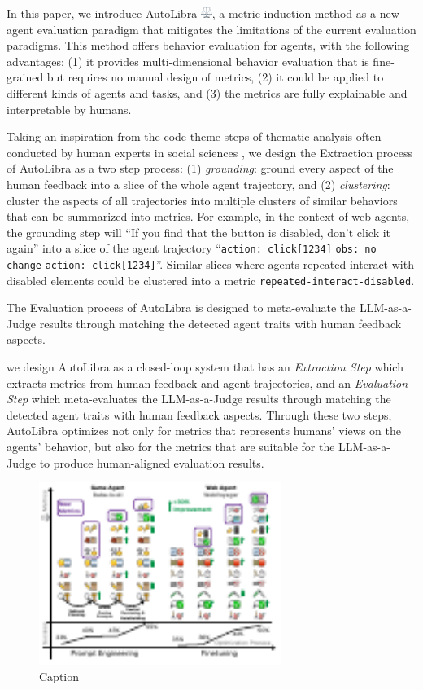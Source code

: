 In this paper, we introduce AutoLibra \protect\includegraphics[height=1em]{figs/scale.png},
a metric induction method as a new agent evaluation paradigm 
that mitigates the limitations of the current evaluation paradigms.
This method offers behavior evaluation for agents, with the following advantages:
(1) it provides multi-dimensional behavior evaluation that is fine-grained but requires no manual design of metrics,
(2) it could be applied to different kinds of agents and tasks, and 
(3) the metrics are fully explainable and interpretable by humans.

Taking an inspiration from the code-theme steps of thematic analysis often conducted by human experts in social sciences \citep{braun2006using},
we design the Extraction process of AutoLibra as a two step process:
(1) \emph{grounding}: ground every aspect of the human feedback into a slice of the whole agent trajectory,
and (2) \emph{clustering}: cluster the aspects of all trajectories into multiple clusters of similar behaviors
that can be summarized into metrics. For example, in the context of web agents, the grounding step will
``\textsf{If you find that the button is disabled, don't click it again}'' into a slice of the agent trajectory
``\texttt{action: click[1234]} \texttt{obs: no change} \texttt{action: click[1234]}''. Similar slices where 
agents repeated interact with disabled elements could be clustered into a metric \texttt{repeated-interact-disabled}. 

The Evaluation process of AutoLibra is designed to meta-evaluate the LLM-as-a-Judge results
through matching the detected agent traits with human feedback aspects.


we design AutoLibra as a closed-loop system
that has an \emph{Extraction Step} which extracts metrics from human feedback and agent trajectories,
and an \emph{Evaluation Step} which meta-evaluates the LLM-as-a-Judge results
through matching the detected agent traits with human feedback aspects. 
Through these two steps, AutoLibra optimizes not only for metrics that represents humans' views on the
agents' behavior, but also for the metrics that are suitable for the LLM-as-a-Judge to produce human-aligned
evaluation results.

\begin{figure}
    \centering
    \includegraphics[width=0.7\textwidth]{figs/autolibra-teaser.pdf}
    \caption{Caption}
    \label{fig:enter-label}
\end{figure}

